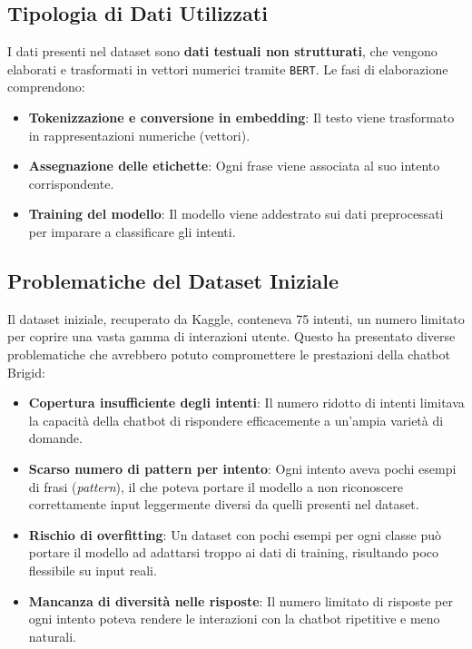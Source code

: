 \documentclass[12pt, letterpaper]{article}
\begin{document}
\subsection{Tipologia di Dati Utilizzati}
I dati presenti nel dataset sono \textbf{dati testuali non strutturati}, che vengono elaborati e trasformati in vettori numerici tramite \texttt{BERT}. Le fasi di elaborazione comprendono:
\begin{itemize}
\item \textbf{Tokenizzazione e conversione in embedding}: Il testo viene trasformato in rappresentazioni numeriche (vettori).
\item \textbf{Assegnazione delle etichette}: Ogni frase viene associata al suo intento corrispondente.
\item \textbf{Training del modello}: Il modello viene addestrato sui dati preprocessati per imparare a classificare gli intenti.
\end{itemize}

\subsection{Problematiche del Dataset Iniziale}
Il dataset iniziale, recuperato da Kaggle, conteneva 75 intenti, un numero limitato per coprire una vasta gamma di interazioni utente. Questo ha presentato diverse problematiche che avrebbero potuto compromettere le prestazioni della chatbot Brigid:

\begin{itemize}
	\item \textbf{Copertura insufficiente degli intenti}: Il numero ridotto di intenti limitava la capacità della chatbot di rispondere efficacemente a un’ampia varietà di domande.
	\item \textbf{Scarso numero di pattern per intento}: Ogni intento aveva pochi esempi di frasi (\textit{pattern}), il che poteva portare il modello a non riconoscere correttamente input leggermente diversi da quelli presenti nel dataset.
	\item \textbf{Rischio di overfitting}: Un dataset con pochi esempi per ogni classe può portare il modello ad adattarsi troppo ai dati di training, risultando poco flessibile su input reali.
	\item \textbf{Mancanza di diversità nelle risposte}: Il numero limitato di risposte per ogni intento poteva rendere le interazioni con la chatbot ripetitive e meno naturali.
\end{itemize}
\end{document}
